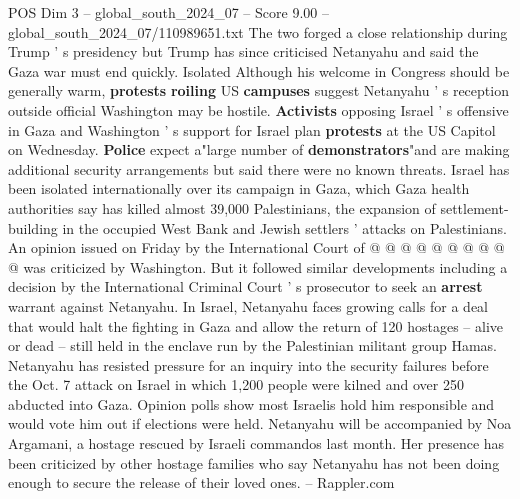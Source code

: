 \begin{textsample}{POS Dim 3 – global\_south\_2024\_07 – Score 9.00 – global\_south\_2024\_07/110989651.txt}
The two forged a close relationship during Trump ' s presidency but Trump has since criticised Netanyahu and said the Gaza war must end quickly.
Isolated Although his welcome in Congress should be generally warm, \textbf{protests} \textbf{roiling} US \textbf{campuses} suggest Netanyahu ' s reception outside official Washington may be hostile. \textbf{Activists} opposing Israel ' s offensive in Gaza and Washington ' s support for Israel plan \textbf{protests} at the US Capitol on Wednesday. \textbf{Police} expect a"large number of \textbf{demonstrators}"and are making additional security arrangements but said there were no known threats.
Israel has been isolated internationally over its campaign in Gaza, which Gaza health authorities say has killed almost 39,000 Palestinians, the expansion of settlement-building in the occupied West Bank and Jewish settlers ' attacks on Palestinians.
An opinion issued on Friday by the International Court of @ @ @ @ @ @ @ @ @ @ was criticized by Washington.
But it followed similar developments including a decision by the International Criminal Court ' s prosecutor to seek an \textbf{arrest} warrant against Netanyahu.
In Israel, Netanyahu faces growing calls for a deal that would halt the fighting in Gaza and allow the return of 120 hostages -- alive or dead -- still held in the enclave run by the Palestinian militant group Hamas.
Netanyahu has resisted pressure for an inquiry into the security failures before the Oct. 7 attack on Israel in which 1,200 people were kilned and over 250 abducted into Gaza.
Opinion polls show most Israelis hold him responsible and would vote him out if elections were held.
Netanyahu will be accompanied by Noa Argamani, a hostage rescued by Israeli commandos last month.
Her presence has been criticized by other hostage families who say Netanyahu has not been doing enough to secure the release of their loved ones. -- Rappler.com

\end{textsample}

